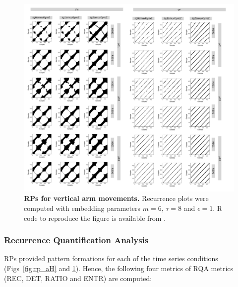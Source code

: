 \begin{figure}[!h]
\centering
\includegraphics[width=1.0\textwidth]{rp_aV}
\caption{
	{\bf RPs for vertical arm movements.}	
	Recurrence plots were computed with 
	embedding parameters $m=6$, $\tau=8$ and $\epsilon=1$.
	R code to reproduce the figure is available from \cite{hwum2018}.
        }
    \label{fig:rp_aV}
\end{figure}








\subsubsection{Recurrence Quantification Analysis}
RPs provided pattern formations for each of the time series 
conditions (Figs~\ref{fig:rp_aH} and \ref{fig:rp_aV}).
Hence, the following four metrics of RQA metrics 
(REC, DET, RATIO and ENTR) are computed:

